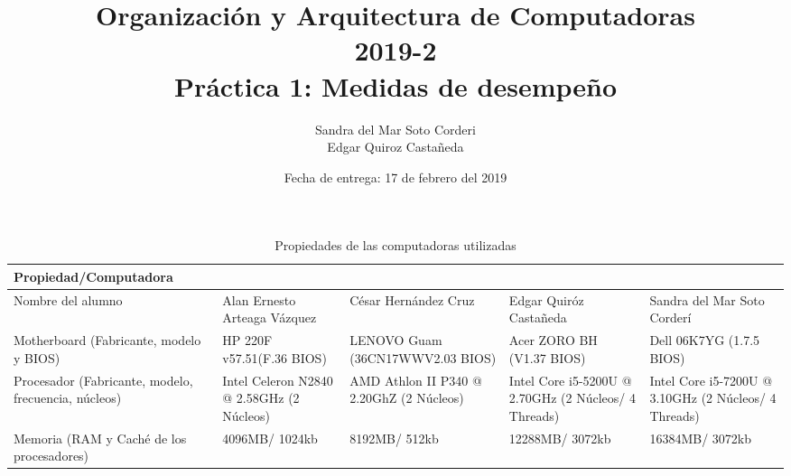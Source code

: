 \documentclass{article}
\begin{document}
    
    \title{Organización y Arquitectura de Computadoras\\
    \large 2019-2 \\
    \large Práctica 1: Medidas de desempeño}

    \date{Fecha de entrega: 17 de febrero del 2019}

    \author{Sandra del Mar Soto Corderi\\
    Edgar Quiroz Castañeda}

    \maketitle

    
\begin{table}[H]
\caption*{Propiedades de las computadoras utilizadas}
\begin{tabularx}{\linewidth}{|L|L|L|L|L|}
\hline
Propiedad/Computadora                                   &  &      &                 &  \\ \hline
{}Nombre del alumno        & Alan Ernesto Arteaga	Vázquez                              &  	César Hernández Cruz                            & Edgar Quiróz	Castañeda  & Sandra del Mar Soto Corderí  \\ \hline
{}Motherboard (Fabricante, modelo y BIOS)           & HP 220F v57.51(F.36 BIOS)                              & LENOVO Guam (36CN17WWV2.03 BIOS)                            & Acer ZORO BH (V1.37 BIOS)                                              & Dell 06K7YG (1.7.5 BIOS)                                 \\ \hline
{}Procesador (Fabricante, modelo, frecuencia, núcleos)             & Intel Celeron N2840 @ 2.58GHz (2 Núcleos)                & AMD Athlon II P340 @ 2.20GhZ (2 Núcleos)                      & Intel Core i5-5200U @ 2.70GHz (2 Núcleos/ 4 Threads)                     & Intel Core i5-7200U @ 3.10GHz (2 Núcleos/ 4 Threads)       \\ \hline
{}Memoria (RAM y Caché de los procesadores)                & 4096MB/ 1024kb                                                & 8192MB/ 512kb                                                     & 12288MB/ 3072kb                                                                & 16384MB/ 3072kb                                                  \\ \hline

\end{tabularx}
\end{table}
\end{document}
